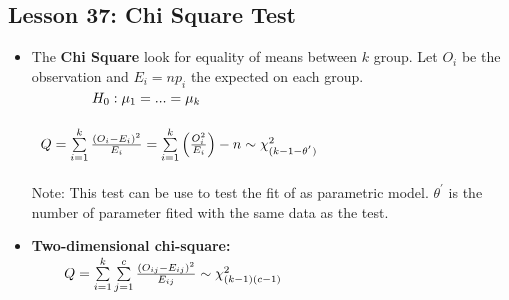 \documentclass[10pt, french]{article}
\begin{document}
\begin{multicols*}{3}
\section*{Lesson 37: Chi Square Test}
\begin{itemize}[align=left,leftmargin=*]
  \item The \textbf{Chi Square} look for equality of means between $k$ group. Let $O_i$ be the observation and $E_i=np_i$ the expected on each group. \\ $\hspace*{1.5cm} H_0: \mu_1 = ... = \mu_k$ \\ \\
  $\hspace*{0.2cm} Q = \sum\limits_{i=1}^k \frac{(O_i - E_i)^2}{E_i} = \sum\limits_{i=1}^k \left(\frac{O_i^2}{E_i}\right) - n \sim \chi_{(k-1-\theta^{'})}^2$ \\ \\
  Note: This test can be use to test the fit of as parametric model. $\theta^{'}$ is the number of parameter fited with the same data as the test.
  \item \textbf{Two-dimensional chi-square:} \\
  $\hspace*{0.8cm} Q = \sum\limits_{i=1}^k \sum\limits_{j=1}^c \frac{(O_{ij}-E_{ij})^2}{E_{ij}} \sim \chi^2_{(k-1)(c-1)}$
\end{itemize}


\end{multicols*}
\end{document}
